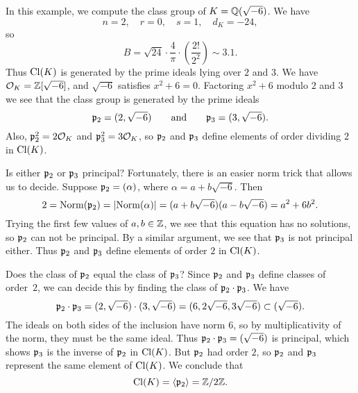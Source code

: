 \begin{example}
	In this example, we compute the class group of $K=\mathbb{Q}(\sqrt{-6})$.
	We have
	$$
		n = 2, \quad r=0, \quad s=1, \quad d_K = -24,
	$$
	so
	$$
		B = \sqrt{24} \cdot \frac{4}{\pi} \cdot
		\left(\frac{2!}{2^2}\right)\sim 3.1.
	$$
	Thus $\operatorname{Cl}(K)$ is generated by the prime ideals lying over $2$ and $3$.
	We have $\mathcal{O}_K=\mathbb{Z}[\sqrt{-6}]$, and $\sqrt{-6}$ satisfies $x^2+6=0$.
	Factoring $x^2+6$ modulo $2$ and $3$ we see that the class group
	is generated by the prime ideals
	$$
		\mathfrak{p}_2 = (2,\sqrt{-6})\qquad\text{and}\qquad
		\mathfrak{p}_3 = (3,\sqrt{-6}).
	$$
	Also, $\mathfrak{p}_2^2 = 2\mathcal{O}_K$ and $\mathfrak{p}_3^2=3\mathcal{O}_K$, so
	$\mathfrak{p}_2$ and $\mathfrak{p}_3$ define elements of order
	dividing $2$ in $\operatorname{Cl}(K)$.

	Is either $\mathfrak{p}_2$ or $\mathfrak{p}_3$ principal?  Fortunately,
	there is an easier norm trick that allows us to decide.
	Suppose $\mathfrak{p}_2 = (\alpha)$, where $\alpha=a+b\sqrt{-6}$.
	Then
	$$
		2 = \operatorname{Norm}(\mathfrak{p}_2)
		= \left|\operatorname{Norm}(\alpha)\right|
		= (a+b\sqrt{-6})(a-b\sqrt{-6})
		= a^2 + 6b^2.
	$$
	Trying the first few values of $a, b\in \mathbb{Z}$, we see that this
	equation has no solutions, so $\mathfrak{p}_2$ can not
	be principal.  By a similar argument, we see that $\mathfrak{p}_3$
	is not principal either.  Thus $\mathfrak{p}_2$ and $\mathfrak{p}_3$ define
	elements of order $2$ in $\operatorname{Cl}(K)$.

	Does the class of $\mathfrak{p}_2$ equal the class of $\mathfrak{p}_3$?
	Since $\mathfrak{p}_2$ and $\mathfrak{p}_3$ define classes of order~$2$,
	we can decide this by finding the class of $\mathfrak{p}_2\cdot \mathfrak{p}_3$.
	We have
	$$
		\mathfrak{p}_2\cdot \mathfrak{p}_3
		= (2,\sqrt{-6})\cdot (3,\sqrt{-6})
		= (6,2\sqrt{-6}, 3\sqrt{-6}) \subset (\sqrt{-6}).
	$$
	The ideals on both sides of the inclusion have norm $6$,
	so by multiplicativity of the norm, they must be the
	same ideal.  Thus $\mathfrak{p}_2\cdot \mathfrak{p}_3=(\sqrt{-6})$ is principal,
	which shows $\mathfrak{p}_3$ is the inverse of $\mathfrak{p}_2$ in $\operatorname{Cl}(K)$. But
	$\mathfrak{p}_2$ had order $2$,
	so $\mathfrak{p}_2$ and $\mathfrak{p}_3$ represent the same element of $\operatorname{Cl}(K)$.
	We conclude that
	$$
		\operatorname{Cl}(K) = \langle \mathfrak{p}_2 \rangle = \mathbb{Z}/2\mathbb{Z}.
	$$
\end{example}

